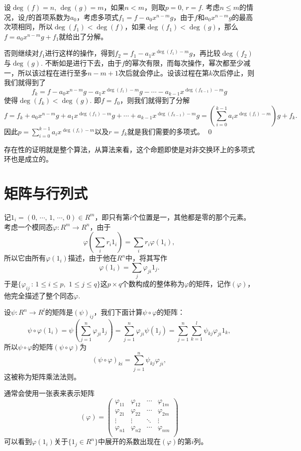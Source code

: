	设$\deg(f)=n$, $\deg(g)=m$，如果$n<m$，则取$p=0$, $r=f$. 考虑$n\leq m$的情况，设$f$的首项系数为$a_0$，考虑多项式$f_1=f-a_0x^{n-m}g$，由于$f$和$a_0x^{n-m}g$的最高次项相同，所以$\deg(f_1)<\deg(f)$，如果$\deg(f_1)<\deg(g)$，那么$f=a_0x^{n-m}g+f_1$就给出了分解。

	否则继续对$f_1$进行这样的操作，得到$f_2=f_1-a_1x^{\deg(f_1)-m}g$，再比较$\deg(f_2)$与$\deg(g)$. 不断如是进行下去，由于$f$的幂次有限，而每次操作，幂次都至少减一，所以该过程在进行至多$n-m+1$次后就会停止。设该过程在第$k$次后停止，则我们就得到了
	\[
	f_{k}=f-a_0x^{n-m}g-a_1x^{\deg(f_1)-m}g-\cdots-a_{k-1}x^{\deg(f_{k-1})-m}g
	\]
	使得$\deg(f_k)< \deg(g)$. 即$f=f_0$，则我们就得到了分解
	\[
	f=f_k+a_0x^{n-m}g+a_1x^{\deg(f_1)-m}g+\cdots+a_{k-1}x^{\deg(f_{k-1})-m}g=\left(\sum_{i=0}^{k-1}a_{i}x^{\deg(f_{i})-m}\right)g+f_k.
	\]
	因此$p=\sum_{i=0}^{k-1}a_{i}x^{\deg(f_{i})-m}$以及$r=f_k$就是我们需要的多项式。
\qed

存在性的证明就是整个算法，从算法来看，这个命题即使是对非交换环上的多项式环也是成立的。

\section{矩阵与行列式}

\para 记$1_i=(0,\,\cdots\!,\,1,\,\cdots\!,\,0)\in R^m$，即只有第$i$个位置是一，其他都是零的那个元素。考虑一个模同态$\varphi:R^m\to R^n$，由于
\[
	\varphi\left(\sum_{i} r_i1_i\right)=\sum_{i} r_i\varphi\left(1_i\right),
\]
所以它由所有$\varphi\left(1_i\right)$描述，由于他在$R^n$中，将其写作
\[
	\varphi\left(1_i\right)=\sum_{j}\varphi_{ji}1_j.
\]
于是$\{\varphi_{ij}\,:\, 1\leq i \leq p,\,\,1\leq j \leq q\}$这$p\times q$个数构成的整体称为$\varphi$的矩阵，记作$(\varphi)$，他完全描述了整个同态$\varphi$.

设$\psi:R^n\to R^l$的矩阵是$(\psi)_{ij}$，我们下面计算$\psi\circ\varphi$的矩阵：
\[
	\psi\circ\varphi(1_i)=\psi\left(\sum_{j=1}^n\varphi_{ji}1_j\right)=\sum_{j=1}^n\varphi_{ji}\psi(1_j)=\sum_{j=1}^n\sum_{k=1}^l\psi_{kj}\varphi_{ji}1_k,
\]
所以$\psi\circ\varphi$的矩阵$(\psi\circ\varphi)$为
\[
	(\psi\circ\varphi)_{ki}=\sum_{j=1}^n\psi_{kj}\varphi_{ji},
\]
这被称为矩阵乘法法则。

\para 通常会使用一张表来表示矩阵
\[
(\varphi)=
\begin{pmatrix}
	\varphi_{11} & \varphi_{12} & \cdots & \varphi_{1m}\\
	\varphi_{21} & \varphi_{22} & \cdots & \varphi_{2m}\\
	\vdots & \vdots & \ddots & \vdots \\
	\varphi_{n1} & \varphi_{n2} & \cdots & \varphi_{nm}\\
\end{pmatrix}
\]
可以看到$\varphi(1_i)$关于$\{1_j\in R^n\}$中展开的系数出现在$(\varphi)$的第$i$列。

